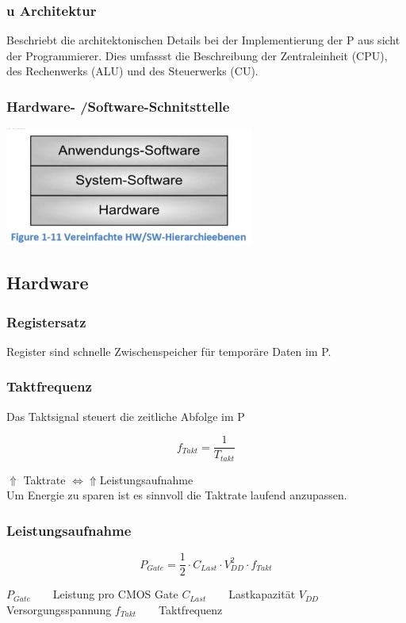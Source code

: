 \subsubsection{u Architektur}
Beschriebt die architektonischen Details bei der Implementierung der \mu P aus sicht der Programmierer.
Dies umfassst die Beschreibung der Zentraleinheit (CPU), des Rechenwerks (ALU) und des Steuerwerks (CU).

\subsubsection{Hardware- /Software-Schnitsttelle}
\includegraphics{images/HardwareSoftware}
\subsection{Hardware}
\subsubsection{Registersatz}
Register sind schnelle Zwischenspeicher für temporäre Daten im \mu P.\\

\subsubsection{Taktfrequenz}
Das Taktsignal steuert die zeitliche Abfolge im \mu P \newline
\begin{multicols}{2}
    \[ f_{Takt}= \frac{1}{T_{takt}} \]
    
    \begin{minipage}{\linewidth}
        $ \Uparrow $ Taktrate $ \Leftrightarrow $$  \Uparrow  $Leistungsaufnahme \\
        Um Energie zu sparen ist es sinnvoll die Taktrate laufend anzupassen.\\
    \end{minipage}
\end{multicols}
\subsubsection{Leistungsaufnahme}
\begin{multicols}{2}
\[ P_{Gate}= \frac{1}{2} \cdot C_{Last} \cdot V_{DD}^2\cdot f_{Takt} \]
\begin{minipage}{\linewidth}
    $ P_{Gate} \qquad$Leistung pro CMOS Gate \newline
    $ C_{Last} \qquad $Lastkapazität\newline
    $ V_{DD}\qquad $Versorgungsspannung\newline
    $ f_{Takt} \qquad$Taktfrequenz
\end{minipage}
\end{multicols}

